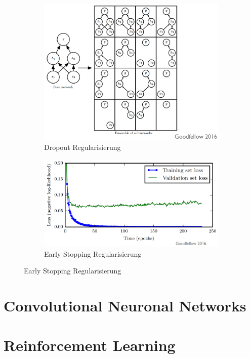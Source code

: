\documentclass[a4paper]{article}
\begin{document}
		\begin{figure}[htb!]
			\centering
			\begin{subfigure}[b]{0.475\textwidth}
				\centering
				\includegraphics[width=\textwidth]{img/06_deep_nn/dropout.png}
				\caption{Dropout Regularisierung}
			\end{subfigure}
			\hfill
			\begin{subfigure}[b]{0.475\textwidth}
				\centering
				\includegraphics[width=\textwidth]{img/06_deep_nn/early_stopping.png}
				\caption{Early Stopping Regularisierung}
			\end{subfigure}
		\end{figure}
		
		
	
	
		
		
	
	\section{Convolutional Neuronal Networks}
	
	
	
	\section{Reinforcement Learning}
	
	
	
	
\end{document}
